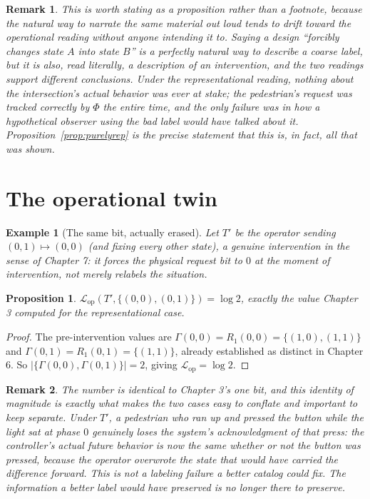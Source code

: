 \documentclass[11pt]{report}
\newtheorem{proposition}{Proposition}[chapter]
\newtheorem{remark}{Remark}[chapter]
\newtheorem{example}{Example}[chapter]
\begin{document}
\begin{remark}
This is worth stating as a proposition rather than a footnote,
because the natural way to narrate the same material out loud tends
to drift toward the operational reading without anyone intending it
to. Saying a design ``forcibly changes state $A$ into state $B$'' is
a perfectly natural way to describe a coarse label, but it is also,
read literally, a description of an intervention, and the two readings
support different conclusions. Under the representational reading,
nothing about the intersection's actual behavior was ever at stake;
the pedestrian's request was tracked correctly by $\Phi$ the entire
time, and the only failure was in how a hypothetical observer using
the bad label would have talked about it. Proposition~\ref{prop:purelyrep}
is the precise statement that this is, in fact, all that was shown.
\end{remark}

\section*{The operational twin}

\begin{example}[The same bit, actually erased]
Let $T'$ be the operator sending $(0,1) \mapsto (0,0)$ (and fixing
every other state), a genuine intervention in the sense of Chapter 7:
it forces the physical request bit to $0$ at the moment of
intervention, not merely relabels the situation.
\end{example}

\begin{proposition}
$\mathcal{L}_{\mathrm{op}}(T', \{(0,0),(0,1)\}) = \log 2$, exactly the
value Chapter 3 computed for the representational case.
\end{proposition}
\begin{proof}
The pre-intervention values are $\Gamma(0,0) = R_1(0,0) =
\{(1,0),(1,1)\}$ and $\Gamma(0,1) = R_1(0,1) = \{(1,1)\}$, already
established as distinct in Chapter 6. So $|\{\Gamma(0,0),\Gamma(0,1)\}|
= 2$, giving $\mathcal{L}_{\mathrm{op}} = \log 2$.
\end{proof}

\begin{remark}
The number is identical to Chapter 3's one bit, and this identity of
magnitude is exactly what makes the two cases easy to conflate and
important to keep separate. Under $T'$, a pedestrian who ran up and
pressed the button while the light sat at phase $0$ genuinely loses
the system's acknowledgment of that press: the controller's actual
future behavior is now the same whether or not the button was pressed,
because the operator overwrote the state that would have carried the
difference forward. This is not a labeling failure a better catalog
could fix. The information a better label would have preserved is no
longer there to preserve.
\end{remark}
\end{document}
